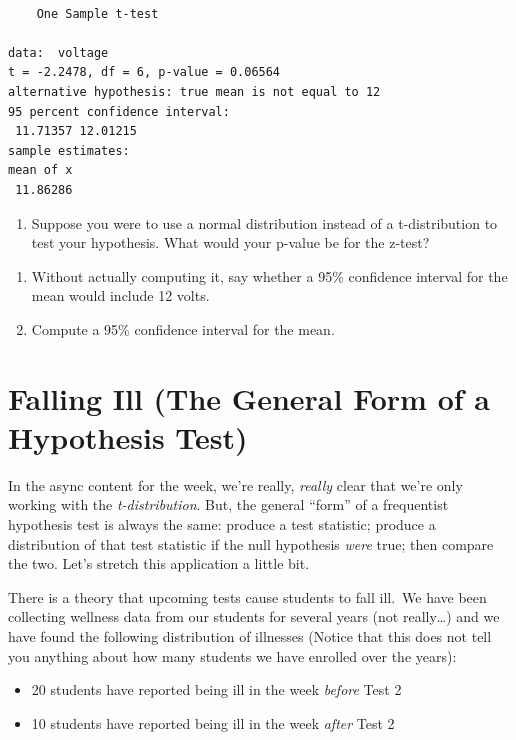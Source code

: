 \documentclass[
  letterpaper,
  DIV=11,
  numbers=noendperiod]{scrreprt}
\providecommand{\tightlist}{%
  \setlength{\itemsep}{0pt}\setlength{\parskip}{0pt}}\usepackage{longtable,booktabs,array}
\begin{document}
\begin{verbatim}

    One Sample t-test

data:  voltage
t = -2.2478, df = 6, p-value = 0.06564
alternative hypothesis: true mean is not equal to 12
95 percent confidence interval:
 11.71357 12.01215
sample estimates:
mean of x 
 11.86286 
\end{verbatim}

\begin{enumerate}
\def\labelenumi{\arabic{enumi}.}
\setcounter{enumi}{5}
\tightlist
\item
  Suppose you were to use a normal distribution instead of a
  t-distribution to test your hypothesis. What would your p-value be for
  the z-test?
\end{enumerate}

\begin{enumerate}
\def\labelenumi{\arabic{enumi}.}
\setcounter{enumi}{6}
\item
  Without actually computing it, say whether a 95\% confidence interval
  for the mean would include 12 volts.
\item
  Compute a 95\% confidence interval for the mean.
\end{enumerate}

\section{Falling Ill (The General Form of a Hypothesis
Test)}\label{falling-ill-the-general-form-of-a-hypothesis-test}

In the async content for the week, we're really, \emph{really} clear
that we're only working with the \emph{t-distribution}. But, the general
``form'' of a frequentist hypothesis test is always the same: produce a
test statistic; produce a distribution of that test statistic if the
null hypothesis \emph{were} true; then compare the two. Let's stretch
this application a little bit.

There is a theory that upcoming tests cause students to fall ill.~We
have been collecting wellness data from our students for several years
(not really\ldots) and we have found the following distribution of
illnesses (Notice that this does not tell you anything about how many
students we have enrolled over the years):

\begin{itemize}
\item
  20 students have reported being ill in the week \emph{before} Test 2
\item
  10 students have reported being ill in the week \emph{after} Test 2
\end{itemize}
\end{document}
